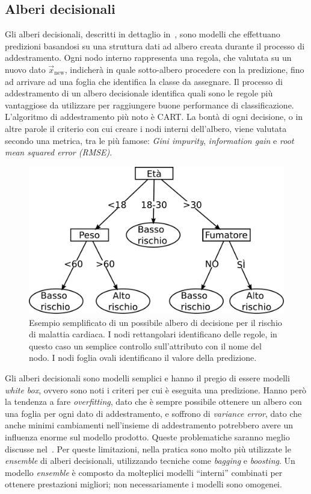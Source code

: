 \subsection{Alberi decisionali}
Gli alberi decisionali, descritti in dettaglio in~\cite{decision_tree}, sono modelli che effettuano predizioni basandosi su una struttura dati ad albero creata durante il processo di addestramento. Ogni nodo interno rappresenta una regola, che valutata su un nuovo dato $\Vec{x}_\text{new}$, indicherà in quale sotto-albero procedere con la predizione, fino ad arrivare ad una foglia che identifica la classe da assegnare. Il processo di addestramento di un albero decisionale identifica quali sono le regole più vantaggiose da utilizzare per raggiungere buone performance di classificazione. 
L'algoritmo di addestramento più noto è CART. 
La bontà di ogni decisione, o in altre parole il criterio con cui creare i nodi interni dell'albero, viene valutata secondo una metrica, tra le più famose: \emph{Gini impurity}, \emph{information gain} e \emph{root mean squared error (RMSE)}. 
\begin{figure}
    \centering
    \includegraphics[width=0.7\linewidth]{img/decision_tree.pdf}
    \caption{Esempio semplificato di un possibile albero di decisione per il rischio di malattia cardiaca. I nodi rettangolari identificano delle regole, in questo caso un semplice controllo sull'attributo con il nome del nodo. I nodi foglia ovali identificano il valore della predizione.}
    \label{fig:decision_tree}
\end{figure}
Gli alberi decisionali sono modelli semplici e hanno il pregio di essere modelli \emph{white box}, ovvero sono noti i criteri per cui è eseguita una predizione.
Hanno però la tendenza a fare \emph{overfitting}, dato che è sempre possibile ottenere un albero con una foglia per ogni dato di addestramento, e soffrono di \emph{variance error}, dato che anche minimi cambiamenti nell'insieme di addestramento potrebbero avere un influenza enorme sul modello prodotto.
Queste problematiche saranno meglio discusse nel~.
Per queste limitazioni, nella pratica sono molto più utilizzate le \emph{ensemble} di alberi decisionali, utilizzando tecniche come \emph{bagging} e \emph{boosting}.
Un modello \emph{ensemble} è composto da molteplici modelli ``interni'' combinati per ottenere prestazioni migliori; non necessariamente i modelli sono omogenei.

